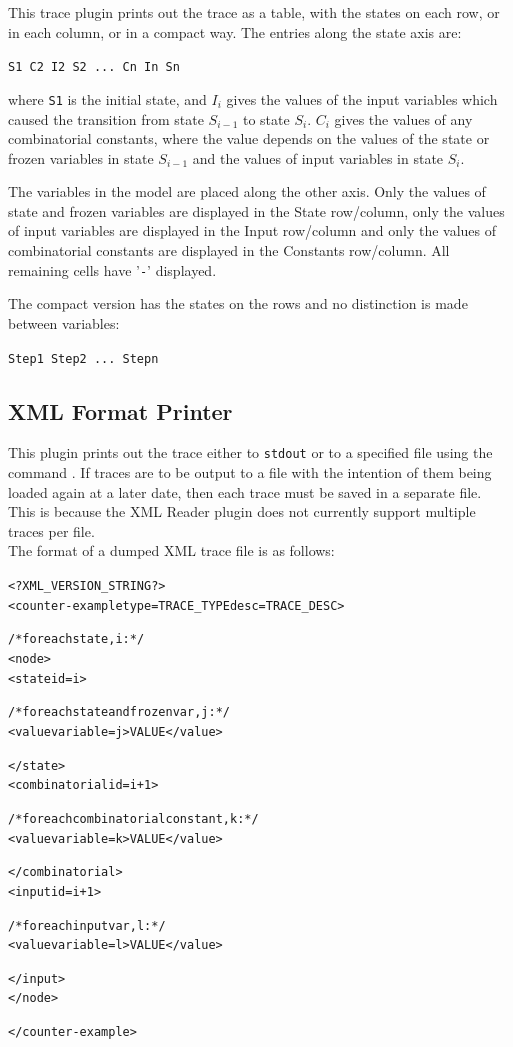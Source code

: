This trace plugin prints out the trace as a table, with the
states on each row, or in each column, or in a compact way. The entries along
the state axis are:

\begin{center}
\texttt{S1 C2 I2 S2 ...~Cn In Sn}
\end{center}

where \texttt{S1} is the initial state, and \texttt{$I_i$} gives the
values of the input variables which caused the transition from state
\texttt{$S_{i-1}$} to state \texttt{$S_i$}. \texttt{$C_i$} gives the
values of any combinatorial constants, where the value depends on the
values of the state or frozen variables in state \texttt{$S_{i-1}$} and the
values of input variables in state \texttt{$S_i$}.

The variables in the model are placed along the other axis. Only the
values of state and frozen variables are displayed in the
State row/column, only
the values of input variables are displayed in the Input row/column
and only the values of combinatorial constants are displayed in the
Constants row/column. All remaining cells have '\texttt{-}' displayed.

The compact version has the states on the rows and no distinction is made
between variables:

\begin{center}
\texttt{Step1 Step2 ...~Stepn}
\end{center}

\subsection{XML Format Printer}
\label{XML Format Printer}

This plugin prints out the trace either to \texttt{stdout} or to a
specified file using the command .  If traces
are to be output to a file with the intention of them being loaded
again at a later date, then each trace must be saved in a separate
file. This is because the XML Reader plugin does not currently support
multiple traces per file.\\The format of a dumped XML trace file is as
follows:

\begin{alltt}
<?XML_VERSION_STRING?>
<counter-example type=TRACE_TYPE desc=TRACE_DESC>

  /* for each state, i: */
  <node>
    <state id=i>

      /* for each state and frozen var, j: */
      <value variable=j>VALUE</value>

    </state>
    <combinatorial id=i+1>

      /* for each combinatorial constant, k: */
      <value variable=k>VALUE</value>

    </combinatorial>
    <input id=i+1>

      /* for each input var, l: */
      <value variable=l>VALUE</value>

    </input>
  </node>

</counter-example>
\end{alltt}

